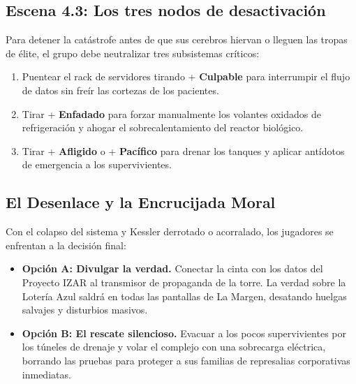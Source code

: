 \subsection{Escena 4.3: Los tres nodos de desactivación}
Para detener la catástrofe antes de que sus cerebros hiervan o lleguen las tropas de élite, el grupo debe neutralizar tres subsistemas críticos:
\begin{enumerate}
  \item {} Puentear el rack de servidores tirando + \textbf{Culpable} para interrumpir el flujo de datos sin freír las cortezas de los pacientes.
  \item {} Tirar + \textbf{Enfadado} para forzar manualmente los volantes oxidados de refrigeración y ahogar el sobrecalentamiento del reactor biológico.
  \item {} Tirar + \textbf{Afligido} o + \textbf{Pacífico} para drenar los tanques y aplicar antídotos de emergencia a los supervivientes.
\end{enumerate}

\subsection{El Desenlace y la Encrucijada Moral}
Con el colapso del sistema y Kessler derrotado o acorralado, los jugadores se enfrentan a la decisión final:
\begin{itemize}
  \item \textbf{Opción A: Divulgar la verdad.} Conectar la cinta con los datos del Proyecto IZAR al transmisor de propaganda de la torre. La verdad sobre la Lotería Azul saldrá en todas las pantallas de La Margen, desatando huelgas salvajes y disturbios masivos.
  \item \textbf{Opción B: El rescate silencioso.} Evacuar a los pocos supervivientes por los túneles de drenaje y volar el complejo con una sobrecarga eléctrica, borrando las pruebas para proteger a sus familias de represalias corporativas inmediatas.
\end{itemize}

